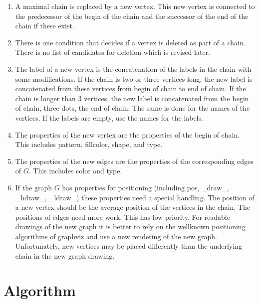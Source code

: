 \documentclass[12pt,a4paper]{report}
\begin{document}
\begin{enumerate}
\item A maximal chain is replaced by a new vertex. This new vertex is connected to the
predecessor of the begin of the chain and the successor of the end of the chain if these exist.

\item There is one condition that decides if a vertex is deleted as part of a chain.
There is no list of candidates for deletion which is revised later.

\item The label of a new vertex is the concatenation of the labels in the chain with some
modifications. If the chain is two or three vertices long, the new label is concatenated
from these vertices from begin of chain to end of chain. If the chain is longer than 3
vertices, the new label is concatenated from the begin of chain, three dots, the end of chain.
The same is done for the names of the vertices. If the labels are empty, use the names for
the labels.

\item The properties of the new vertex are the properties of the begin of chain. This
includes pattern, fillcolor, shape, and type.

\item The properties of the new edges are the properties of the corresponding edges
of $G$. This includes color and type.

\item If the graph $G$ has properties for positioning (including pos, \_draw\_, \_hdraw\_, \_ldraw\_)
these properties need a special handling. The position of a new vertex should be the average
position of the vertices in the chain. The positions of edges need more work. This has low priority.
For readable drawings of the new graph it is better to rely on the wellknown positioning
algorithms of graphviz and use a new rendering of the new graph. Unfortunately, new vertices
may be placed differently than the underlying chain in the new graph drawing.

\end{enumerate}

\chapter{Algorithm}
\end{document}
